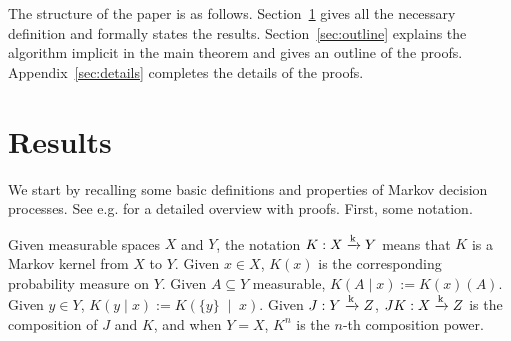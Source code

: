 \documentclass[anon,12pt]{colt2018} %
\newcommand{\Comment}[1]{}
\newcommand{\APM}[2]{\left(#1\;\middle\vert\;#2\right)}
\newcommand{\K}{\xrightarrow{\textnormal{k}}}
\begin{document}
\Comment{We also consider situations in which there are states of the environment (that we call \enquote{corrupted}) for which the reward signal and/or the advisor become unreliable (i.e. the observed reward in these states might be different from the \enquote{true} reward w.r.t. which regret is defined, and the advisor in these states might fail to satisfy the assumptions we otherwise require from it.) For example, we might imagine a robot that, through its own actions, damages its own input channels or even provides \enquote{deliberately} misleading information to the human operator. Indeed, it has been argued~\cite{TBD} that reinforcement learning agents are incentivized to sabotage themselves in this way (for example \enquote{wirehead} i.e. tamper with itself in order to artificially set the reward to maximum) and therefore sufficiently powerful algorithms (beyond the current state of the art) are almost guaranteed to do so. We show that, assuming corrupted states can be avoided without sacrificing utility, and that the advisor in uncorrupted states never acts so as to enter a corrupted state, DRL can be used to achieve essentially the same regret bound as before (and in particular learn to avoid corruption.) Thus DRL not only combats traps in the external environment but also perverse incentives inside the agent itself.}

The structure of the paper is as follows. Section~\ref{sec:results} gives all the necessary definition and formally states the results. Section~\ref{sec:outline} explains the algorithm implicit in the main theorem and gives an outline of the proofs. Appendix~\ref{sec:details} completes the details of the proofs. 

\section{Results}
\label{sec:results}

We start by recalling some basic definitions and properties of Markov decision processes. See e.g. \cite{Feinberg2002} for a detailed overview with proofs. First, some notation. 

Given measurable spaces $X$ and $Y$, the notation $K: X \K Y$ means that $K$ is a Markov kernel from $X$ to $Y$. Given $x \in X$, $K(x)$ is the corresponding probability measure on $Y$. Given $A \subseteq Y$ measurable, $K(A \mid x) := K(x)(A)$. Given $y \in Y$, $K(y \mid x):=K\APM{\{y\}}{x}$. Given $J: Y \K Z$, $JK: X \K Z$ is the composition of $J$ and $K$, and when $Y = X$, $K^n$ is the $n$-th composition power.
\end{document}
